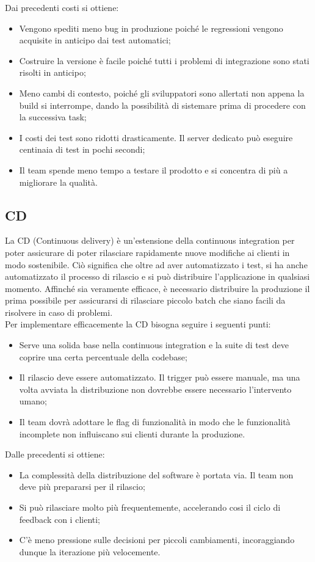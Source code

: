 Dai precedenti costi si ottiene: 
\begin{itemize}
	\item Vengono spediti meno bug in produzione poiché le regressioni vengono acquisite in anticipo dai test automatici;
	\item Costruire la versione è facile poiché tutti i problemi di integrazione sono stati risolti in anticipo; 
	\item Meno cambi di contesto, poiché gli sviluppatori sono allertati non appena la build si interrompe, dando la possibilità di sistemare prima di procedere con la successiva task;
	\item I costi dei test sono ridotti drasticamente. Il server dedicato può eseguire centinaia di test in pochi secondi; 
	\item Il team spende meno tempo a testare il prodotto e si concentra di più a migliorare la qualità.
\end{itemize}


\subsection{CD}
La CD (Continuous delivery) è un'estensione della continuous integration per poter assicurare di poter rilasciare rapidamente nuove modifiche ai clienti in modo sostenibile. Ciò significa che oltre ad aver automatizzato i test, si ha anche automatizzato il processo di rilascio e si può distribuire l'applicazione in qualsiasi momento. 
Affinché sia veramente efficace, è necessario distribuire la produzione il prima possibile per assicurarsi di rilasciare piccolo batch che siano facili da risolvere in caso di problemi. \\
Per implementare efficacemente la CD bisogna seguire i seguenti punti: 
\begin{itemize}
	\item Serve una solida base nella continuous integration e la suite di test deve coprire una certa percentuale della codebase; 
	\item Il rilascio deve essere automatizzato. Il trigger può essere manuale, ma una volta avviata la distribuzione non dovrebbe essere necessario l'intervento umano; 
	\item Il team dovrà adottare le flag di funzionalità in modo che le funzionalità incomplete non influiscano sui clienti durante la produzione. 
\end{itemize}

Dalle precedenti si ottiene: 
\begin{itemize}
\item La complessità della distribuzione del software è portata via. Il team non deve più prepararsi per il rilascio; 
\item Si può rilasciare molto più frequentemente, accelerando cosi il ciclo di feedback con i clienti; 
\item C'è meno pressione sulle decisioni per piccoli cambiamenti, incoraggiando dunque la iterazione più velocemente. 
\end{itemize}



